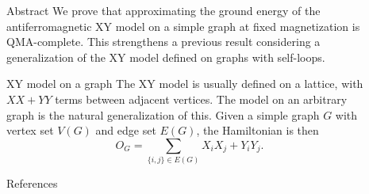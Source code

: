 \documentclass{beamer}
\newlength{\sepwid}
\newlength{\onecolwid}
\begin{document}

\begin{frame}[t]
\begin{columns}[t]
\begin{column}{\sepwid}\end{column}

\begin{column}{\onecolwid}
  \begin{alertblock}{Abstract}
    We prove that approximating the ground energy of the antiferromagnetic XY model on a simple graph at fixed magnetization is QMA-complete.  This strengthens a previous result considering a generalization of the XY model defined on graphs with self-loops.
  \end{alertblock}
  
  \begin{block}{XY model on a graph}
    The XY model is usually defined on a lattice, with $XX + YY$ terms between adjacent vertices.  The model on an arbitrary graph is the natural generalization of this.  Given a simple graph $G$ with vertex set $V(G)$ and edge set $E(G)$, the Hamiltonian is then
    \[
      O_G = \sum_{\{i,j\}\in E(G)} X_i X_j + Y_i Y_j.
    \]
  \end{block}
 
  
  \begin{block}{References}
  \nocite{*}
  
  \footnotesize{}
  \end{block}


\end{column}


\begin{column}{\sepwid}\end{column}

\end{columns}
\end{frame}
\end{document}
